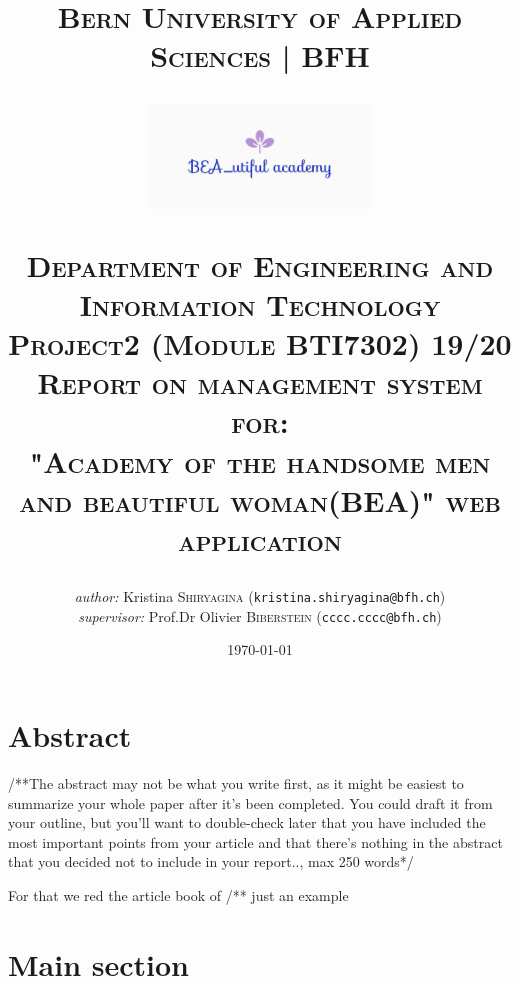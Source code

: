 \documentclass{scrartcl}
\begin{document}
\begin{titlepage}


\title{\textsc{\LARGE Bern University of Applied Sciences | BFH }\\[1cm]
\begin{center}
\includegraphics[width = 60mm]{bea_logo.JPG}
\end{center}
\textsc{\small Department of Engineering and Information Technology}\\
\textsc{\small Project2 (Module BTI7302) 19/20}\\[1cm]
\textsc{\small Report on management system for: }\\
\textsc{"Academy of the handsome men and beautiful woman(BEA)" web application}}
\date{\today}   %
\author{\textit{author: }Kristina \textsc{Shiryagina} (\texttt{kristina.shiryagina@bfh.ch}) \\
 \textit{supervisor: } Prof.Dr Olivier  \textsc{Biberstein}  (\texttt{cccc.cccc@bfh.ch})\\
 }
\maketitle	
	
\tableofcontents
\clearpage
\end{titlepage}


\section{Abstract}
/**The abstract may not be what you write first, as it might be easiest to summarize your whole paper after it's been completed. You could draft it from your outline, but you'll want to double-check later that you have included the most important points from your article and that there's nothing in the abstract that you decided not to include in your report.., max 250 words*/
\lipsum[1-3]


 For that we red the article book of 
\cite{Diniz:2010:UG0:525452.452352}                 /** just an example



\section{Main section}
\end{document}
